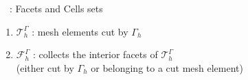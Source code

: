 \begin{frame}{\appendixname~\theappendixframenumber~: Facets and Cells sets}
	
	\vspace{15pt}
	
	\begin{center}
		\begin{minipage}{0.48\linewidth}
			\centering
		\end{minipage} \hfill
		\begin{minipage}{0.48\linewidth}
			\centering
		\end{minipage}
	\end{center}
	
	\begin{enumerate}[\ding{217}]
		\item $\mathcal{T}_h^\Gamma$ : mesh elements cut by $\Gamma_h$
		\item $\mathcal{F}_h^\Gamma$ : collects the interior facets of $\mathcal{T}_h^\Gamma$ \\
		(either cut by $\Gamma_h$ or belonging to a cut mesh element)
	\end{enumerate}
	
\end{frame}

